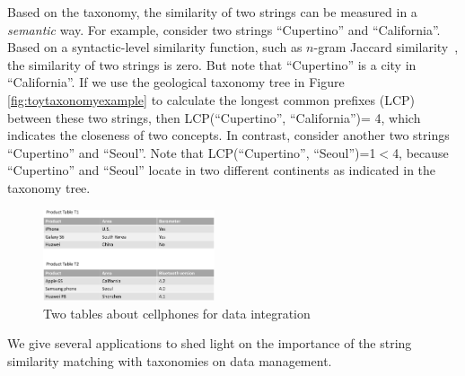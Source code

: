 Based on the taxonomy,  the similarity of two strings can be measured in a \textit{semantic} way. For example, consider two strings ``\textsf{Cupertino}'' and ``\textsf{California}''. Based on a syntactic-level similarity function, such as $n$-gram Jaccard similarity~\cite{conf/icde/ChaudhuriGK06,conf/icde/LiLL08}, the similarity of two strings is zero. But note that ``\textsf{Cupertino}'' is a city in ``\textsf{California}''. If we use the geological taxonomy tree in Figure \ref{fig:toytaxonomyexample} to calculate the longest common prefixes (LCP) between these two strings, then LCP(``\textsf{Cupertino}'', ``\textsf{California}'')= 4, which indicates the closeness of two concepts. In contrast, consider another two strings
 ``\textsf{Cupertino}'' and ``\textsf{Seoul}''. Note that LCP(``\textsf{Cupertino}'', ``\textsf{Seoul}'')=1$<$4, because ``\textsf{Cupertino}'' and ``\textsf{Seoul}'' locate in two different continents as indicated in the taxonomy tree.


\begin{figure}[t]
\centering
\includegraphics[width=0.45\textwidth]{figures/productexample}
 \caption{Two tables about cellphones for data integration}
\label{fig:twotables}
\end{figure}

We give several applications to shed light on the importance of the string similarity matching with taxonomies on data management.

